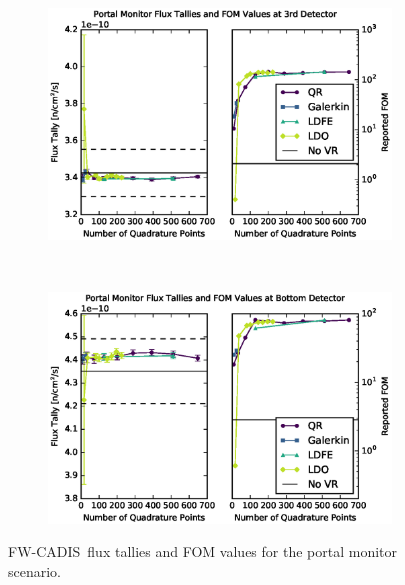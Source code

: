 \documentclass{article} %
\newcommand{\fwc}{\mbox{FW-CADIS}}
\begin{document}
\begin{figure}[!htb]
\ContinuedFloat
\begin{subfigure}{\textwidth}
\centering
\includegraphics[max height=0.445\textheight]
{portal-fwcadis-3.eps}
\end{subfigure}
\\
\begin{subfigure}{\textwidth}
\centering
\includegraphics[max height=0.445\textheight]
{portal-fwcadis-4.eps}
\end{subfigure}
\caption{\fwc\ flux tallies and FOM values for the portal monitor scenario.}
\label{cargo-fwc}
\end{figure}

\FloatBarrier
\end{document}
